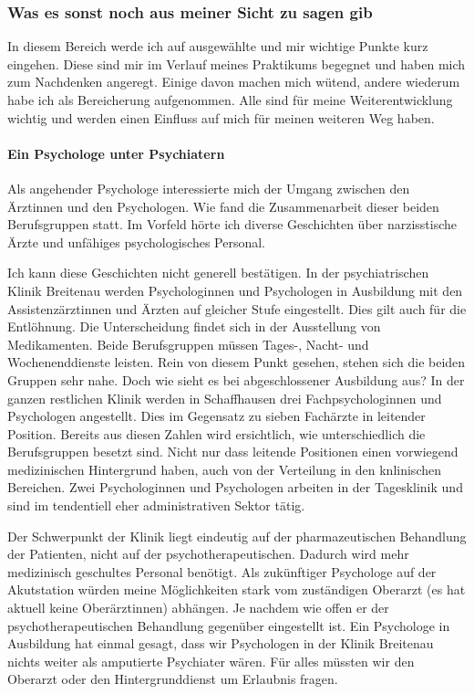 \subsubsection{Was es sonst noch aus meiner Sicht zu sagen gib} \label{sec:Sonstiges}
In diesem Bereich werde ich auf ausgewählte und mir wichtige Punkte kurz eingehen. Diese sind mir im Verlauf meines Praktikums begegnet und haben mich zum Nachdenken angeregt. Einige davon machen mich wütend, andere wiederum habe ich als Bereicherung aufgenommen. Alle sind für meine Weiterentwicklung wichtig und werden einen Einfluss auf mich für meinen weiteren Weg haben.

\paragraph{Ein Psychologe unter Psychiatern}
Als angehender Psychologe interessierte mich der Umgang zwischen den Ärztinnen und den Psychologen. Wie fand die Zusammenarbeit dieser beiden Berufsgruppen statt. Im Vorfeld hörte ich diverse Geschichten über narzisstische Ärzte und unfähiges psychologisches Personal. 

Ich kann diese Geschichten nicht generell bestätigen. In der psychiatrischen Klinik Breitenau werden Psychologinnen und Psychologen in Ausbildung mit den Assistenzärztinnen und Ärzten auf gleicher Stufe eingestellt. Dies gilt auch für die Entlöhnung. Die Unterscheidung findet sich in der Ausstellung von Medikamenten. Beide Berufsgruppen müssen Tages-, Nacht- und Wochenenddienste leisten. Rein von diesem Punkt gesehen, stehen sich die beiden Gruppen sehr nahe. Doch wie sieht es bei abgeschlossener Ausbildung aus? In der ganzen restlichen Klinik werden in Schaffhausen drei Fachpsychologinnen und Psychologen angestellt. Dies im Gegensatz zu sieben Fachärzte in leitender Position. Bereits aus diesen Zahlen wird ersichtlich, wie unterschiedlich die Berufsgruppen besetzt sind. Nicht nur dass leitende Positionen einen vorwiegend medizinischen Hintergrund haben, auch von der Verteilung in den knlinischen Bereichen. Zwei Psychologinnen und Psychologen arbeiten in der Tagesklinik und sind im tendentiell eher administrativen Sektor tätig. 

Der Schwerpunkt der Klinik liegt eindeutig auf der pharmazeutischen Behandlung der Patienten, nicht auf der psychotherapeutischen. Dadurch wird mehr medizinisch geschultes Personal benötigt. Als zukünftiger Psychologe auf der Akutstation würden meine Möglichkeiten stark vom zuständigen Oberarzt (es hat aktuell keine Oberärztinnen) abhängen. Je nachdem wie offen er der psychotherapeutischen Behandlung gegenüber eingestellt ist. Ein Psychologe in Ausbildung hat einmal gesagt, dass wir Psychologen in der Klinik Breitenau nichts weiter als amputierte Psychiater wären. Für alles müssten wir den Oberarzt oder den Hintergrunddienst um Erlaubnis fragen. 

